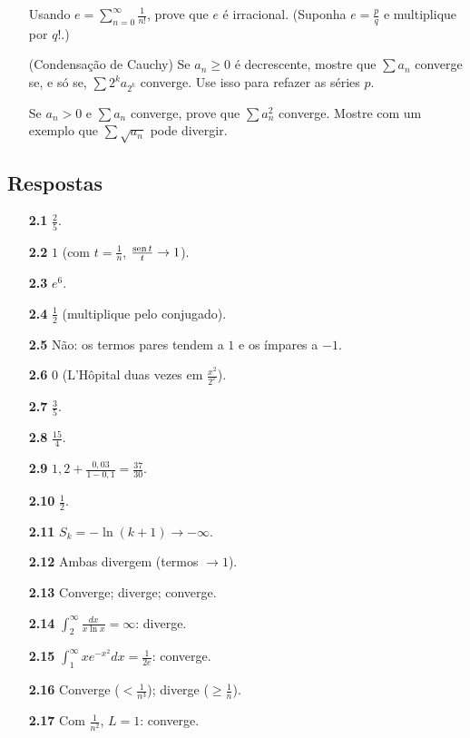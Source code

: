 \begin{itemize}[leftmargin=5.2em,labelsep=0.6em,itemsep=4pt]
\item[\exnum{4}{2.63}] Usando $e=\sum_{n=0}^\infty\frac1{n!}$, prove que $e$ é irracional. (Suponha $e=\frac pq$ e multiplique por $q!$.)
\item[\exnum{4}{2.64}] (Condensação de Cauchy) Se $a_n\ge0$ é decrescente, mostre que $\sum a_n$ converge se, e só se, $\sum2^ka_{2^k}$ converge. Use isso para refazer as séries $p$.
\item[\exnum{4}{2.65}] Se $a_n>0$ e $\sum a_n$ converge, prove que $\sum a_n^2$ converge. Mostre com um exemplo que $\sum\sqrt{a_n}$ pode divergir.
\end{itemize}
\subsection*{Respostas}
{\small\begin{multicols}{2}\raggedright
\begin{itemize}[leftmargin=2.7em,labelsep=0.5em,itemsep=1pt]
\item[\textbf{2.1}] $\tfrac25$.
\item[\textbf{2.2}] $1$ (com $t=\frac1n$, $\frac{\operatorname{sen} t}t\to1$).
\item[\textbf{2.3}] $e^6$.
\item[\textbf{2.4}] $\tfrac12$ (multiplique pelo conjugado).
\item[\textbf{2.5}] Não: os termos pares tendem a $1$ e os ímpares a $-1$.
\item[\textbf{2.6}] $0$ (L'Hôpital duas vezes em $\frac{x^2}{2^x}$).
\item[\textbf{2.7}] $\tfrac35$.
\item[\textbf{2.8}] $\tfrac{15}4$.
\item[\textbf{2.9}] $1{,}2+\tfrac{0{,}03}{1-0{,}1}=\tfrac{37}{30}$.
\item[\textbf{2.10}] $\tfrac12$.
\item[\textbf{2.11}] $S_k=-\ln(k+1)\to-\infty$.
\item[\textbf{2.12}] Ambas divergem (termos $\to1$).
\item[\textbf{2.13}] Converge; diverge; converge.
\item[\textbf{2.14}] $\int_2^\infty\tfrac{dx}{x\ln x}=\infty$: diverge.
\item[\textbf{2.15}] $\int_1^\infty xe^{-x^2}dx=\tfrac1{2e}$: converge.
\item[\textbf{2.16}] Converge ($<\tfrac1{n^3}$); diverge ($\ge\tfrac1n$).
\item[\textbf{2.17}] Com $\tfrac1{n^2}$, $L=1$: converge.

\end{itemize}
\end{multicols}}
